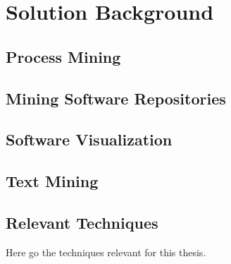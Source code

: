 \chapter{Solution Background}
\label{chap:ch3-solution-background}

\section{Process Mining}
\label{sec:process-mining}

\section{Mining Software Repositories}
\label{sec:msr}

\section{Software Visualization}
\label{sec:visualization}

\section{Text Mining}
\label{sec:text-mining}

\section{Relevant Techniques}
\label{sec:relevant-techniques}

Here go the techniques relevant for this thesis.

